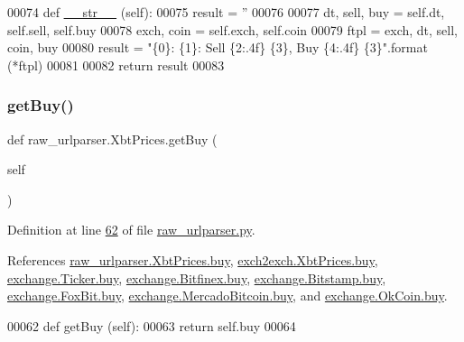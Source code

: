\begin{DoxyCode}
00074     \textcolor{keyword}{def }\hyperlink{namespacerates_a2f1a70c33ee9e255938e4c19fd207264}{\_\_str\_\_} (self):
00075         result = \textcolor{stringliteral}{''}
00076         
00077         dt, sell, buy = self.dt, self.sell, self.buy
00078         exch, coin   = self.exch, self.coin
00079         ftpl = exch, dt, sell, coin, buy
00080         result = \textcolor{stringliteral}{"\{0\}: \{1\}: Sell \{2:.4f\} \{3\}, Buy \{4:.4f\} \{3\}"}.format (*ftpl)
00081         
00082         \textcolor{keywordflow}{return} result
00083         
\end{DoxyCode}
\mbox{\label{classraw__urlparser_1_1_xbt_prices_a263e29ed8476de0cdce0017695f7baaa}} 
\subsubsection{\texorpdfstring{get\+Buy()}{getBuy()}}
{\footnotesize\ttfamily def raw\+\_\+urlparser.\+Xbt\+Prices.\+get\+Buy (\begin{DoxyParamCaption}\item[{}]{self }\end{DoxyParamCaption})}



Definition at line \hyperlink{raw__urlparser_8py_source_l00062}{62} of file \hyperlink{raw__urlparser_8py_source}{raw\+\_\+urlparser.\+py}.



References \hyperlink{raw__urlparser_8py_source_l00055}{raw\+\_\+urlparser.\+Xbt\+Prices.\+buy}, \hyperlink{exch2exch_8py_source_l00059}{exch2exch.\+Xbt\+Prices.\+buy}, \hyperlink{exchange_8py_source_l00060}{exchange.\+Ticker.\+buy}, \hyperlink{exchange_8py_source_l00430}{exchange.\+Bitfinex.\+buy}, \hyperlink{exchange_8py_source_l00502}{exchange.\+Bitstamp.\+buy}, \hyperlink{exchange_8py_source_l00574}{exchange.\+Fox\+Bit.\+buy}, \hyperlink{exchange_8py_source_l00642}{exchange.\+Mercado\+Bitcoin.\+buy}, and \hyperlink{exchange_8py_source_l00707}{exchange.\+Ok\+Coin.\+buy}.


\begin{DoxyCode}
00062     \textcolor{keyword}{def }getBuy (self):
00063         \textcolor{keywordflow}{return} self.buy
00064         
\end{DoxyCode}
\mbox{\label{classraw__urlparser_1_1_xbt_prices_abb420398e97de1582f8be154c6a66133}} 
